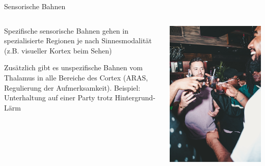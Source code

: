 \documentclass[aspectratio=169]{beamer}
\begin{document}
\begin{frame}{Sensorische Bahnen}


\begin{columns}[c]

\begin{column}{5cm} 
Spezifische sensorische Bahnen gehen in spezialisierte Regionen je nach Sinnesmodalität (z.B. visueller Kortex beim Sehen)  \\[0.2 cm]

\pause

Zusätzlich gibt es unspezifische Bahnen vom Thalamus in alle Bereiche des Cortex (ARAS, Regulierung der Aufmerksamkeit). Beispiel: Unterhaltung auf einer Party trotz Hintergrund-Lärm

\end{column}

\begin{column}{5cm}
\begin{center}
    \includegraphics[width=\textwidth]{party.jpg}
\end{center}

\end{column}


\end{columns}







\end{frame}
\end{document}
